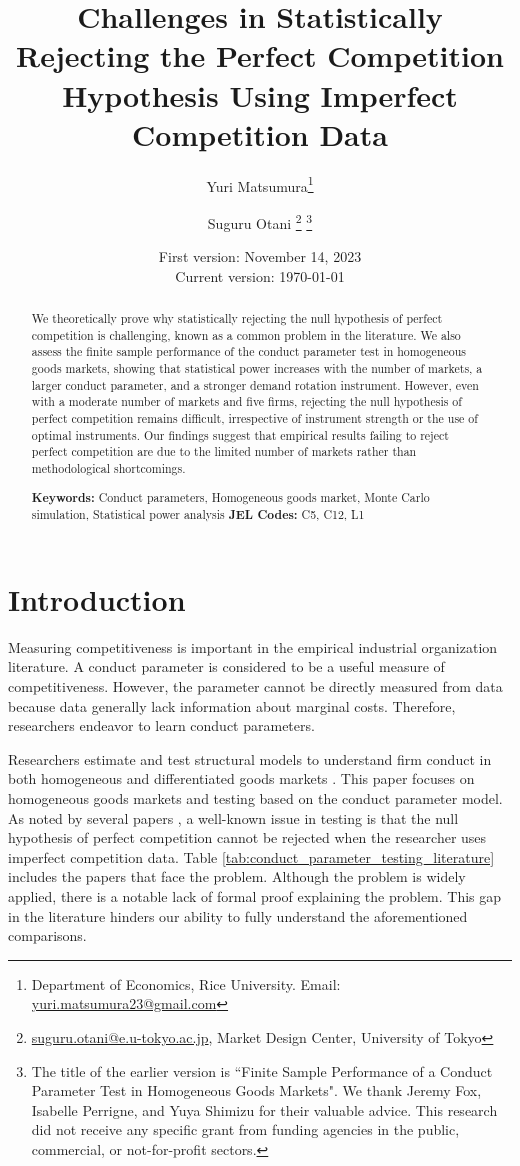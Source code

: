 \documentclass[11pt, a4paper]{article}
\title{Challenges in Statistically Rejecting the Perfect Competition Hypothesis Using Imperfect Competition Data}
\author{Yuri Matsumura\thanks{Department of Economics, Rice University. Email: \href{mailto:}{yuri.matsumura23@gmail.com}} \and Suguru Otani \thanks{\href{mailto:}{suguru.otani@e.u-tokyo.ac.jp}, Market Design Center, University of Tokyo
}
\thanks{
The title of the earlier version is ``Finite Sample Performance of a Conduct Parameter Test in Homogeneous Goods Markets".
We thank Jeremy Fox, Isabelle Perrigne, and Yuya Shimizu for their valuable advice. This research did not receive any specific grant from funding agencies in the public, commercial, or not-for-profit sectors. }}
\date{
First version: November 14, 2023\\
Current version: \today
}
\begin{document}
\maketitle
\begin{abstract}
    We theoretically prove why statistically rejecting the null hypothesis of perfect competition is challenging, known as a common problem in the literature. We also assess the finite sample performance of the conduct parameter test in homogeneous goods markets, showing that statistical power increases with the number of markets, a larger conduct parameter, and a stronger demand rotation instrument. However, even with a moderate number of markets and five firms, rejecting the null hypothesis of perfect competition remains difficult, irrespective of instrument strength or the use of optimal instruments. Our findings suggest that empirical results failing to reject perfect competition are due to the limited number of markets rather than methodological shortcomings.
\vspace{0.1in}

\noindent\textbf{Keywords:} Conduct parameters, Homogeneous goods market, Monte Carlo simulation, Statistical power analysis
\vspace{0in}
\newline
\noindent\textbf{JEL Codes:} C5, C12, L1

\bigskip
\end{abstract}


\section{Introduction}
Measuring competitiveness is important in the empirical industrial organization literature.
A conduct parameter is considered to be a useful measure of competitiveness. 
However, the parameter cannot be directly measured from data because data generally lack information about marginal costs.
Therefore, researchers endeavor to learn conduct parameters.

Researchers estimate and test structural models to understand firm conduct in both homogeneous and differentiated goods markets \citep{bresnahan1982oligopoly,nevoIdentificationOligopolySolution1998, magnolfi2022comparison, duarte2023testing}.
This paper focuses on homogeneous goods markets and testing based on the conduct parameter model.
As noted by several papers \citep{genesove1998testing, steen1999testing, shaffer1993test}, a well-known issue in testing is that the null hypothesis of perfect competition cannot be rejected when the researcher uses imperfect competition data.
Table \ref{tab:conduct_parameter_testing_literature} includes the papers that face the problem.
Although the problem is widely applied, there is a notable lack of formal proof explaining the problem.
This gap in the literature hinders our ability to fully understand the aforementioned comparisons.
\end{document}
